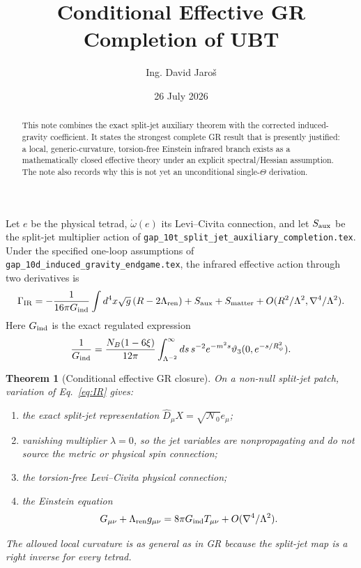\documentclass[11pt,a4paper]{article}
\title{Conditional Effective GR Completion of UBT}
\author{Ing. David Jaro\v{s}}
\date{26 July 2026}
\newtheorem{theorem}{Theorem}
\begin{document}
\maketitle
\begin{abstract}
This note combines the exact split-jet auxiliary theorem with the corrected
induced-gravity coefficient.  It states the strongest complete GR result that
is presently justified: a local, generic-curvature, torsion-free Einstein
infrared branch exists as a mathematically closed effective theory under an
explicit spectral/Hessian assumption.  The note also records why this is not
yet an unconditional single-$\Theta$ derivation.
\end{abstract}

Let $e$ be the physical tetrad, $\mathring\omega(e)$ its Levi--Civita
connection, and let $S_{\rm aux}$ be the split-jet multiplier action of
\texttt{gap\_10t\_split\_jet\_auxiliary\_completion.tex}.  Under the specified
one-loop assumptions of
\texttt{gap\_10d\_induced\_gravity\_endgame.tex}, the infrared effective action
through two derivatives is
\begin{equation}
 \Gamma_{\rm IR}
 =-\frac1{16\pi G_{\rm ind}}
 \int d^4x\sqrt g\,(R-2\Lambda_{\rm ren})
 +S_{\rm aux}+S_{\rm matter}
 +O(R^2/\Lambda^2,\nabla^4/\Lambda^2).
 \label{eq:IR}
\end{equation}
Here $G_{\rm ind}$ is the exact regulated expression
\begin{equation}
 \frac1{G_{\rm ind}}
 =\frac{N_B(1-6\xi)}{12\pi}
 \int_{\Lambda^{-2}}^\infty ds\,s^{-2}e^{-m^2s}
 \vartheta_3(0,e^{-s/R_\psi^2}).
\end{equation}

\begin{theorem}[Conditional effective GR closure]
On a non-null split-jet patch, variation of Eq.~\eqref{eq:IR} gives:
\begin{enumerate}
 \item the exact split-jet representation
 $\widehat D_\mu X=\sqrt{\mathcal N_0}e_\mu$;
 \item vanishing multiplier $\lambda=0$, so the jet variables are
 nonpropagating and do not source the metric or physical spin connection;
 \item the torsion-free Levi--Civita physical connection;
 \item the Einstein equation
 \begin{equation}
 G_{\mu\nu}+\Lambda_{\rm ren}g_{\mu\nu}
 =8\pi G_{\rm ind}T_{\mu\nu}
 +O(\nabla^4/\Lambda^2).
 \end{equation}
\end{enumerate}
The allowed local curvature is as general as in GR because the split-jet map is
a right inverse for every tetrad.
\end{theorem}
\end{document}
